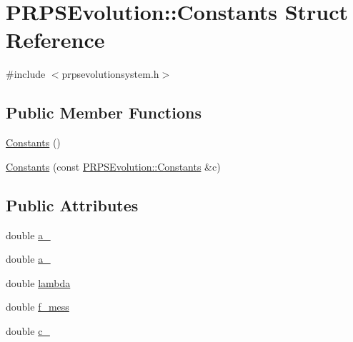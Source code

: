 \hypertarget{struct_p_r_p_s_evolution_1_1_constants}{\section{\-P\-R\-P\-S\-Evolution\-:\-:\-Constants \-Struct \-Reference}
\label{struct_p_r_p_s_evolution_1_1_constants}
}


{\ttfamily \#include $<$prpsevolutionsystem.\-h$>$}

\subsection*{\-Public \-Member \-Functions}
\begin{DoxyCompactItemize}
\item 
\hyperlink{struct_p_r_p_s_evolution_1_1_constants_a01e71e11b5a7c9e8b698a325e0384cf3}{\-Constants} ()
\item 
\hyperlink{struct_p_r_p_s_evolution_1_1_constants_aeab0b34d417727d0be8cdc26a8e1edc3}{\-Constants} (const \hyperlink{struct_p_r_p_s_evolution_1_1_constants}{\-P\-R\-P\-S\-Evolution\-::\-Constants} \&c)
\end{DoxyCompactItemize}
\subsection*{\-Public \-Attributes}
\begin{DoxyCompactItemize}
\item 
double \hyperlink{struct_p_r_p_s_evolution_1_1_constants_a74a4e2d7cb4a447c8645252362b0212f}{a\-\_}
\item 
double \hyperlink{struct_p_r_p_s_evolution_1_1_constants_af8ee2ccd3b06dad85eed4dbe4e9a82bc}{a\-\_}
\item 
double \hyperlink{struct_p_r_p_s_evolution_1_1_constants_ace86405b7931058d3c8fae37b1fb84ba}{lambda}
\item 
double \hyperlink{struct_p_r_p_s_evolution_1_1_constants_ae5505f026f90560d42e3c86b5efa64e7}{f\-\_\-mess}
\item 
double \hyperlink{struct_p_r_p_s_evolution_1_1_constants_a457de2084d859c1d171004547253a891}{c\-\_}
\end{DoxyCompactItemize}


